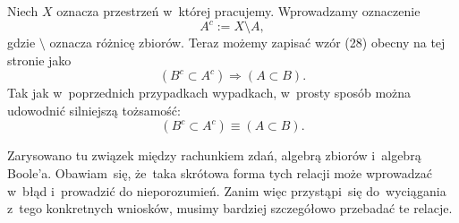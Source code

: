 \documentclass[a4paper,11pt]{article}
\numberwithin{equation}{section}
\begin{document}
 Niech $X$ oznacza przestrzeń w~której pracujemy. Wprowadzamy
oznaczenie
\begin{equation}
  \label{eq:Kuratowski-Wstep-do-teorii-mnogosci-ETC-08}
  A^{ c } := X \setminus A,
\end{equation}
gdzie $\setminus$ oznacza różnicę zbiorów. Teraz możemy zapisać wzór (28)
obecny na tej stronie jako
\begin{equation}
  \label{eq:Kuratowski-Wstep-do-teorii-mnogosci-ETC-09}
  ( B^{ c } \subset A^{ c } ) \Rightarrow ( A \subset B ).
\end{equation}
Tak jak w~poprzednich przypadkach wypadkach, w~prosty sposób można
udowodnić silniejszą tożsamość:
\begin{equation}
  \label{eq:Kuratowski-Wstep-do-teorii-mnogosci-ETC-10}
  ( B^{ c } \subset A^{ c } ) \equiv ( A \subset B ).
\end{equation}

\VerSpaceFour





 Zarysowano tu związek między rachunkiem zdań, algebrą zbiorów
i~algebrą Boole'a. Obawiam~się, że~taka skrótowa forma tych relacji może
wprowadzać w~błąd i~prowadzić do nieporozumień. Zanim więc przystąpi~się
do~wyciągania z~tego konkretnych wniosków, musimy bardziej szczegółowo
przebadać te relacje.

\VerSpaceFour














\VerSpaceFive
\end{document}
